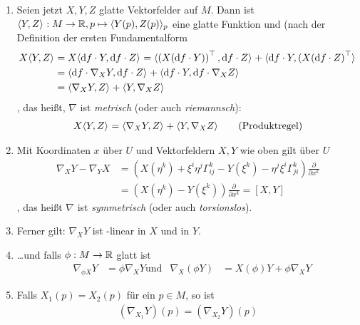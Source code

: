 \documentclass{skript}
\begin{document}
\begin{enumerate}
  \item Seien jetzt $X,Y,Z$ glatte Vektorfelder auf $M$.
    Dann ist $\sprod{Y,Z}:M\to\R, p\mapsto\sprod[p]{Y(p), Z(p)}$ eine glatte
    Funktion und (nach der Definition der ersten Fundamentalform
    \begin{align*}
      X\sprod{Y,Z} &= X\sprod{\d f\cdot Y, \d f\cdot Z} = \sprod{\left( X(\d
      f\cdot Y) \right)^\top, \d f\cdot Z} + \sprod{\d f\cdot Y, \left( X(\d
      f\cdot Z \right)^\top} \\
      &= \sprod{\d f\cdot\nabla_XY,\d f\cdot Z} + \sprod{\d f\cdot Y, \d
      f\cdot\nabla_XZ} \\
      &= \sprod{\nabla_XY,Z} + \sprod{Y,\nabla_XZ}
    \end{align*}, das heißt, $\nabla$ ist \emph{metrisch} (oder auch
    \emph{riemannsch}):
    \begin{align*}
      X\sprod{Y,Z} = \sprod{\nabla_XY,Z} + \sprod{Y,\nabla_XZ} &\quad&
      \text{(Produktregel)}
    \end{align*}

  \item Mit Koordinaten $x$ über $U$ und Vektorfeldern $X,Y$ wie oben gilt über
    $U$
    \begin{align*}
      \nabla_XY - \nabla_YX &= \left( X(\eta^k) + \xi^i\eta^j\Gamma^k_{ij} -
      Y(\xi^k) - \eta^j\xi^i\Gamma_{ji}^k \right)\frac{\partial}{\partial x^k}
      \\
      &= \left( X(\eta^k) - Y(\xi^k) \right)\frac{\partial}{\partial x^k} =
      \left[ X, Y \right]
    \end{align*}, das heißt $\nabla$ ist \emph{symmetrisch} (oder auch
    \emph{torsionslos}).

  \item Ferner gilt: $\nabla_XY$ ist \R-linear in $X$ und in $Y$.
  \item \ldots und falls $\phi:M\to\mathbb{R}$ glatt ist
    \begin{align*}
      &\nabla_{\phi X}Y &= \phi\nabla_XY
      \text{und} & \nabla_X(\phi Y) &= X(\phi)Y + \phi\nabla_XY
    \end{align*}
  \item Falls $X_1(p) = X_2(p)$ für ein $p\in M$, so ist
    \begin{align*}
      \left( \nabla_{X_1}Y \right)(p) = \left( \nabla_{X_2}Y \right)(p)
    \end{align*}
\end{enumerate}
\end{document}
